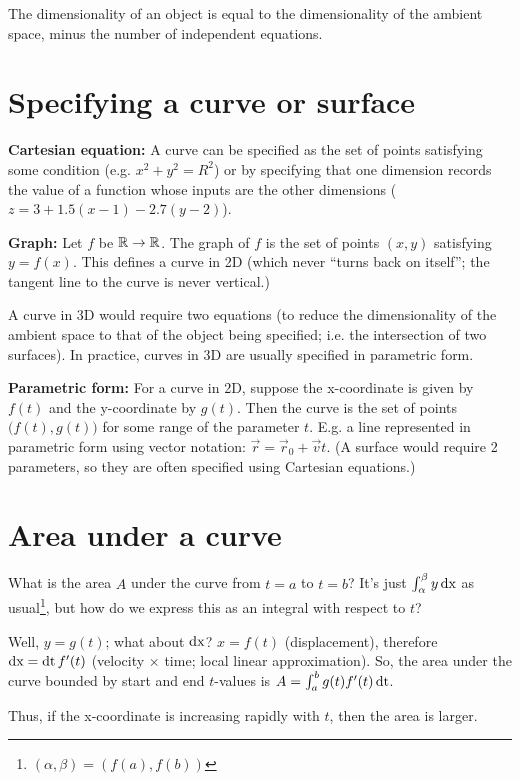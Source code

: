 \documentclass[12pt]{article}
\begin{document}
The dimensionality of an object is equal to the dimensionality of the ambient
space, minus the number of independent equations.

\section{Specifying a curve or surface}

\textbf{Cartesian equation:} A curve can be specified as the set of points
satisfying some condition (e.g. $x^2 + y^2 = R^2$) or by specifying that one
dimension records the value of a function whose inputs are the other
dimensions ($z = 3 + 1.5(x-1) - 2.7(y-2)$).

\textbf{Graph:} Let $f$ be $\mathbb{R} \to \mathbb{R}$. The graph of $f$ is the set of points
$(x,y)$ satisfying $y = f(x)$. This defines a curve in 2D (which never ``turns
back on itself''; the tangent line to the curve is never vertical.)

A curve in 3D would require two equations (to reduce the dimensionality of the
ambient space to that of the object being specified; i.e. the intersection of
two surfaces). In practice, curves in 3D are usually specified in parametric
form.

\textbf{Parametric form:} For a curve in 2D, suppose the x-coordinate is given
by $f(t)$ and the y-coordinate by $g(t)$. Then the curve is the set of points
$\big(f(t), g(t)\big)$ for some range of the parameter $t$. E.g. a line
represented in parametric form using vector notation:
$\vec r = \vec r_0 + \vec v t$. (A surface would require 2 parameters, so they
are often specified using Cartesian equations.)


\section{Area under a curve}

What is the area $A$ under the curve from $t=a$ to $t=b$? It's just
$\int_\alpha^\beta y \operatorname{\text{dx}}$ as usual\footnote{$(\alpha, \beta) = (f(a), f(b))$},
but how do we express this as an integral with respect to $t$?

Well, $y = g(t)$; what about $\operatorname{\text{dx}}$? $x = f(t)$ (displacement), therefore
$\operatorname{\text{dx}} = \operatorname{\text{dt}} f'(t)$ (velocity $\times$ time; local linear approximation). So, the
area under the curve bounded by start and end $t$-values is
$A = \int_a^b g(t) f'(t) \operatorname{\text{dt}}$.

Thus, if the x-coordinate is increasing rapidly with $t$, then the area is
larger.
\end{document}
